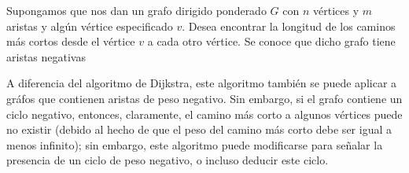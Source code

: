 Supongamos que nos dan un grafo dirigido ponderado $G$ con $n$ vértices y $m$ aristas y algún vértice especificado $v$. Desea encontrar la longitud de los caminos más cortos desde el vértice $v$ a cada otro vértice. Se conoce que dicho grafo tiene aristas negativas

A diferencia del algoritmo de Dijkstra, este algoritmo también se puede aplicar a gráfos que contienen aristas de peso negativo. Sin embargo, si el grafo contiene un ciclo negativo, entonces, claramente, el camino más corto a algunos vértices puede no existir (debido al hecho de que el peso del camino más corto debe ser igual a menos infinito); sin embargo, este algoritmo puede modificarse para señalar la presencia de un ciclo de peso negativo, o incluso deducir este ciclo.